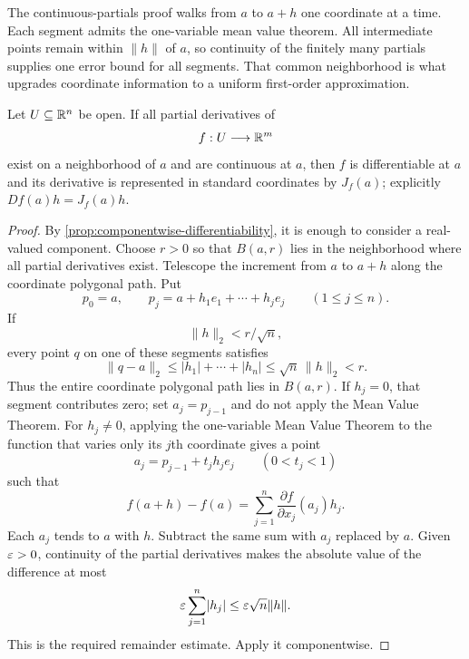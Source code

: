 \begin{center}
\end{center}
The continuous-partials proof walks from $a$ to $a+h$ one coordinate
at a time. Each segment admits the one-variable mean value theorem.
All intermediate points remain within $\|h\|$ of $a$, so continuity
of the finitely many partials supplies one error bound for all segments.
That common neighborhood is what upgrades coordinate information to a
uniform first-order approximation.
\begin{theorem}
\label{thm:c1-implies-differentiable}
Let $U\subseteq\mathbb{R}^n$ be open.  If all partial derivatives of
\[
f:U\longrightarrow\mathbb{R}^m
\]
exist on a neighborhood of $a$ and are continuous at $a$, then $f$ is
differentiable at $a$ and its derivative is represented in standard
coordinates by $J_f(a)$; explicitly $Df(a)h=J_f(a)h$.
\end{theorem}
\begin{proof}
By \cref{prop:componentwise-differentiability}, it is enough to consider a
real-valued component. Choose $r>0$ so that $B(a,r)$ lies in the neighborhood
where all partial derivatives exist. Telescope the increment from $a$ to
$a+h$ along the coordinate polygonal path. Put
\[
p_0=a,
\qquad
p_j=a+h_1e_1+\cdots+h_je_j
\qquad(1\leq j\leq n).
\]
If
\[
\|h\|_2<r/\sqrt n,
\]
 every point $q$ on one of these segments satisfies
\[
\|q-a\|_2\leq |h_1|+\cdots+|h_n|
\leq\sqrt n\,\|h\|_2<r.
\]
Thus the entire coordinate polygonal path lies in $B(a,r)$. If
$h_j=0$, that segment contributes zero; set $a_j=p_{j-1}$ and do not
apply the Mean Value Theorem. For $h_j\ne0$, applying
the one-variable Mean Value Theorem to the function that varies only its
\(j\)th coordinate gives a point
\[
a_j=p_{j-1}+t_jh_je_j
\qquad(0<t_j<1)
\]
such that
\[
f(a+h)-f(a)
=
\sum_{j=1}^{n}
\frac{\partial f}{\partial x_j}(a_j)h_j.
\]
Each \(a_j\) tends to \(a\) with \(h\).  Subtract the same sum with \(a_j\)
replaced by \(a\).  Given \(\varepsilon>0\), continuity of the partial derivatives
makes the absolute value of the difference at most
\[
\varepsilon\sum_{j=1}^{n}\lvert h_j\rvert
\leq
\varepsilon\sqrt n\lVert h\rVert.
\]
This is the required remainder estimate.  Apply it componentwise.
\end{proof}

